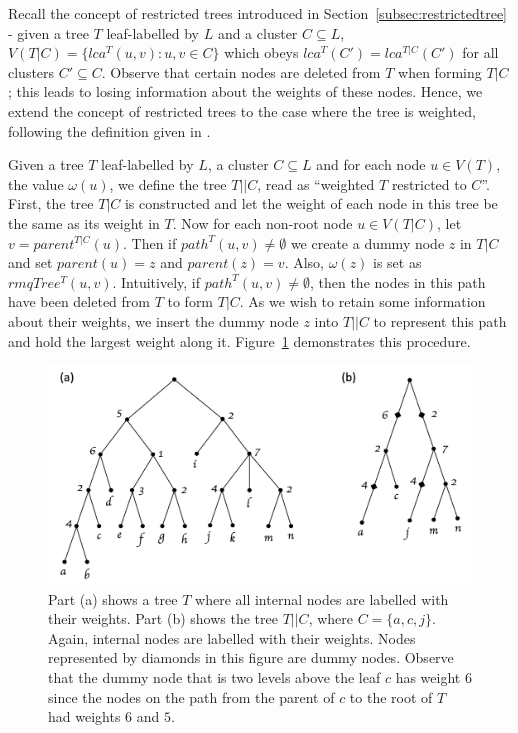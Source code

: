 \documentclass[final,1p,times]{elsarticle}
\newcommand{\weight}{\omega}
\begin{document}
    Recall the concept of restricted trees introduced in Section~\ref{subsec:restrictedtree} - given a tree $T$ leaf-labelled by $L$ and a cluster $C \subseteq L$, $V(T|C) = \{lca^T(u, v) : u, v \in C\}$ which obeys $lca^T(C') = lca^{T|C}(C')$ for all clusters $C' \subseteq C$. Observe that certain nodes are deleted from $T$ when forming $T|C$; this leads to losing information about the weights of these nodes. Hence, we extend the concept of restricted trees to the case where the tree is weighted, following the definition given in \cite{jansson2018algorithms}.

    Given a tree $T$ leaf-labelled by $L$, a cluster $C \subseteq L$ and for each node $u \in V(T)$, the value $\weight(u)$, we define the tree $T||C$, read as ``weighted $T$ restricted to $C$''. First, the tree $T|C$ is constructed and let the weight of each node in this tree be the same as its weight in $T$. Now for each non-root node $u \in V(T|C)$, let $v = parent^{T|C}(u)$. Then if $path^{T}(u, v) \neq \emptyset$ we create a dummy node $z$ in $T|C$ and set $parent(u) = z$ and $parent(z) = v$. Also, $\weight(z)$ is set as $rmqTree^{T}(u, v)$. Intuitively, if $path^{T}(u, v) \neq \emptyset$, then the nodes in this path have been deleted from $T$ to form $T|C$. As we wish to retain some information about their weights, we insert the dummy node $z$ into $T||C$ to represent this path and hold the largest weight along it. Figure~\ref{fig:dummynodes} demonstrates this procedure.

    \begin{figure}[ht]
        \includegraphics[scale=0.5]{dummynodes}
        \centering
        \caption[Constructing the tree $T||C$]{Part (a) shows a tree $T$ where all internal nodes are labelled with their weights. Part (b) shows the tree $T||C$, where $C = \{a, c, j\}$. Again, internal nodes are labelled with their weights. Nodes represented by diamonds in this figure are dummy nodes. Observe that the dummy node that is two levels above the leaf $c$ has weight $6$ since the nodes on the path from the parent of $c$ to the root of $T$ had weights $6$ and $5$.}
        \label{fig:dummynodes}
    \end{figure}
\end{document}
